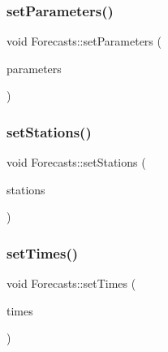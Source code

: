 \mbox{\label{class_forecasts_a8dd1f257833a71c72deb3e8d595d607e}} 
\subsubsection{\texorpdfstring{set\+Parameters()}{setParameters()}}
{\footnotesize\ttfamily void Forecasts\+::set\+Parameters (\begin{DoxyParamCaption}\item[{\mbox{\hyperlink{classanen_par_1_1_parameters}{anen\+Par\+::\+Parameters}}}]{parameters }\end{DoxyParamCaption})}

\mbox{\label{class_forecasts_aeb1ca08f01a0ff5145607f8e962fb750}} 
\subsubsection{\texorpdfstring{set\+Stations()}{setStations()}}
{\footnotesize\ttfamily void Forecasts\+::set\+Stations (\begin{DoxyParamCaption}\item[{\mbox{\hyperlink{classanen_sta_1_1_stations}{anen\+Sta\+::\+Stations}}}]{stations }\end{DoxyParamCaption})}

\mbox{\label{class_forecasts_a85263c55dda71ef3363afbd2be337eed}} 
\subsubsection{\texorpdfstring{set\+Times()}{setTimes()}}
{\footnotesize\ttfamily void Forecasts\+::set\+Times (\begin{DoxyParamCaption}\item[{\mbox{\hyperlink{classanen_time_1_1_times}{anen\+Time\+::\+Times}}}]{times }\end{DoxyParamCaption})}

\mbox{\label{class_forecasts_a4ce21957ef296384b1e251098db953bc}} 
